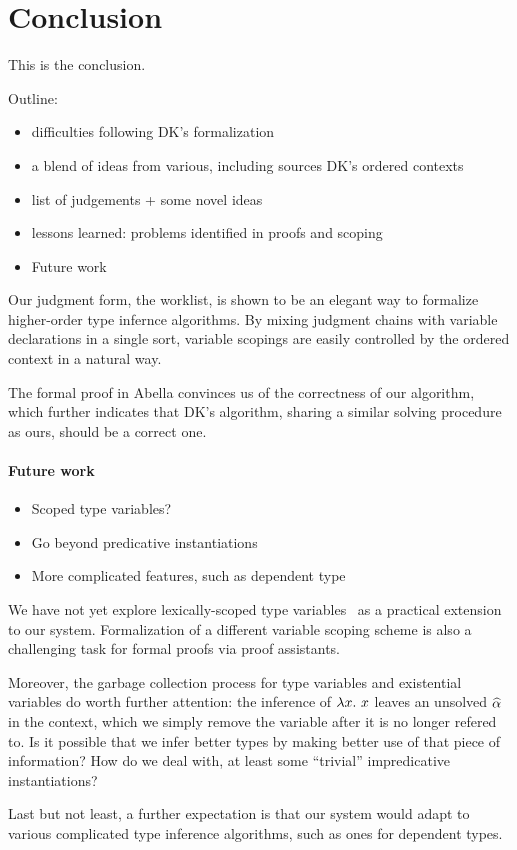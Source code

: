 \section{Conclusion}

This is the conclusion.


Outline:
\begin{itemize}
    \item difficulties following DK's formalization
    \item a blend of ideas from various, including sources DK's ordered contexts
    \item list of judgements + some novel ideas
    \item lessons learned: problems identified in proofs and scoping
    \item Future work
\end{itemize}

Our judgment form, the worklist, is shown to be an elegant way to
formalize higher-order type infernce algorithms.
By mixing judgment chains with variable declarations in a single sort,
variable scopings are easily controlled by the ordered context in a natural way.

The formal proof in Abella convinces us of the correctness of our algorithm,
which further indicates that DK's algorithm, sharing a similar solving procedure as ours,
should be a correct one.

\paragraph{Future work}
\begin{itemize}
    \item Scoped type variables?
    \item Go beyond predicative instantiations
    \item More complicated features, such as dependent type
\end{itemize}

We have not yet explore lexically-scoped type variables~\cite{jones2003lexically}
as a practical extension to our system.
Formalization of a different variable scoping scheme is also
a challenging task for formal proofs via proof assistants.

Moreover, the garbage collection process for type variables and
existential variables do worth further attention:
the inference of $\lam x$ leaves an unsolved $\al$ in the context,
which we simply remove the variable after it is no longer refered to.
Is it possible that we infer better types by making better use of that piece of information?
How do we deal with, at least some ``trivial'' impredicative instantiations?

Last but not least, a further expectation is that our system would
adapt to various complicated type inference algorithms,
such as ones for dependent types.
